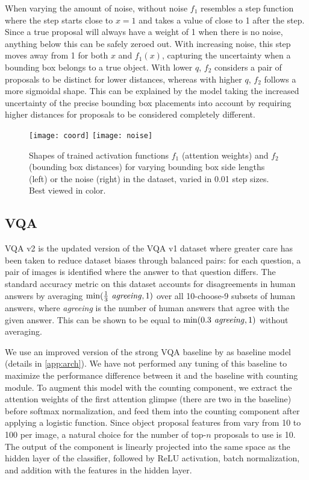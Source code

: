 \documentclass[letterpaper]{article}
\begin{document}
When varying the amount of noise, without noise $f_1$ resembles a step function where the step starts close to $x=1$ and takes a value of close to 1 after the step.
Since a true proposal will always have a weight of 1 when there is no noise, anything below this can be safely zeroed out.
With increasing noise, this step moves away from 1 for both $x$ and $f_1(x)$, capturing the uncertainty when a bounding box belongs to a true object.
With lower $q$, $f_2$ considers a pair of proposals to be distinct for lower distances, whereas with higher $q$, $f_2$ follows a more sigmoidal shape.
This can be explained by the model taking the increased uncertainty of the precise bounding box placements into account by requiring higher distances for proposals to be considered completely different.

\begin{figure}
    \centering
    \texttt{[image: coord]}
    \texttt{[image: noise]}
    \caption{
        Shapes of trained activation functions $f_1$ (attention weights) and $f_2$ (bounding box distances) for varying bounding box side lengths (left) or the noise (right) in the dataset, varied in 0.01 step sizes.
        Best viewed in color.
    }
    \label{fig:trained-plins}
\end{figure}


\subsection{VQA}
VQA v2 \citep{Goyal2017a} is the updated version of the VQA v1 dataset \citep{Agrawal2015a} where greater care has been taken to reduce dataset biases through balanced pairs:
for each question, a pair of images is identified where the answer to that question differs.
The standard accuracy metric on this dataset accounts for disagreements in human answers by averaging $\min(\frac{1}{3} \text{\emph{ agreeing}}, 1)$ over all 10-choose-9 subsets of human answers, where \emph{agreeing} is the number of human answers that agree with the given answer.
This can be shown to be equal to $\min(0.3 \text{\emph{ agreeing}}, 1)$ without averaging.

We use an improved version of the strong VQA baseline by \citet{Kazemi2017a} as baseline model (details in \autoref{app:arch}).
We have not performed any tuning of this baseline to maximize the performance difference between it and the baseline with counting module.
To augment this model with the counting component, we extract the attention weights of the first attention glimpse (there are two in the baseline) before softmax normalization, and feed them into the counting component after applying a logistic function.
Since object proposal features from \citet{Anderson2017a} vary from 10 to 100 per image, a natural choice for the number of top-$n$ proposals to use is 10.
The output of the component is linearly projected into the same space as the hidden layer of the classifier, followed by ReLU activation, batch normalization, and addition with the features in the hidden layer.
\end{document}
